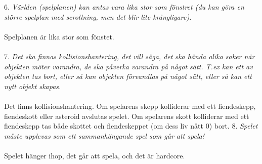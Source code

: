 \documentclass{TDP003mall}
\begin{document}
6. \emph{Världen (spelplanen) kan antas vara lika stor som fönstret (du kan göra en större spelplan med scrollning, men det blir lite krångligare).} \\
\\
Spelplanen är lika stor som fönstet. \\
\\
7. \emph{Det ska finnas kollisionshantering, det vill säga, det ska hända olika saker när objekten möter varandra, de ska påverka varandra på något sätt. T.ex kan ett av objekten tas bort, eller så kan objekten förvandlas på något sätt, eller så kan ett nytt objekt skapas.}\\
\\
Det finns kollisionshantering. Om spelarens skepp kolliderar med ett fiendeskepp, fiendeskott eller asteroid
avslutas spelet. Om spelarens skott kolliderar med ett fiendeskepp tas både skottet och fiendeskeppet (om dess
liv nått 0) bort.
8. \emph{Spelet måste upplevas som ett sammanhängande spel som går att spela! } \\
\\
Spelet hänger ihop, det går att spela, och det är hardcore.
\end{document}
